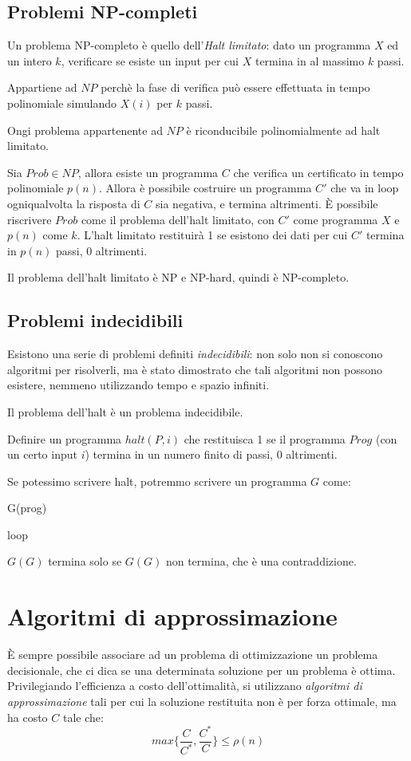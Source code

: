 \documentclass[11pt]{book}
\begin{document}
\section{Problemi NP-completi}
Un problema NP-completo è quello dell'\textit{Halt limitato}: dato un programma $X$ ed un intero $k$, verificare se esiste 
un input per cui $X$ termina in al massimo $k$ passi.

Appartiene ad $NP$ perchè la fase di verifica può essere effettuata in tempo polinomiale simulando $X(i)$ per $k$ passi.

Ongi problema appartenente ad $NP$ è riconducibile polinomialmente ad halt limitato. 

Sia $Prob\in NP$, allora esiste un programma $C$ che verifica un certificato in tempo polinomiale $p(n)$. Allora è possibile 
costruire un programma $C'$ che va in loop ogniqualvolta la risposta di $C$ sia negativa, e termina altrimenti.
È possibile riscrivere $Prob$ come il problema dell'halt limitato, con $C'$ come programma $X$ e $p(n)$ come $k$.
L'halt limitato restituirà 1 se esistono dei dati per cui $C'$ termina in $p(n)$ passi, 0 altrimenti.

Il problema dell'halt limitato è NP e NP-hard, quindi è NP-completo.
\section{Problemi indecidibili}
Esistono una serie di problemi definiti \textit{indecidibili}: non solo non si conoscono algoritmi per risolverli, ma è 
stato dimostrato che tali algoritmi non possono esistere, nemmeno utilizzando tempo e spazio infiniti.

Il problema dell'halt è un problema indecidibile.

Definire un programma $halt(P,i)$ che restituisca 1 se il programma $Prog$ (con un certo input $i$) termina in un numero 
finito di passi, 0 altrimenti.

Se potessimo scrivere halt, potremmo scrivere un programma $G$ come:
\begin{algorithm}[H]
    \caption{G(prog)}
    \begin{algorithmic}
            \State loop 
        \Else{} 
        \EndIf
    \end{algorithmic}
\end{algorithm}
$G(G)$ termina solo se $G(G)$ non termina, che è una contraddizione.
\chapter{Algoritmi di approssimazione}
È sempre possibile associare ad un problema di ottimizzazione un problema decisionale, che ci dica se una determinata soluzione 
per un problema è ottima. Privilegiando l'efficienza a costo dell'ottimalità, si utilizzano \textit{algoritmi di approssimazione}
tali per cui la soluzione restituita non è per forza ottimale, ma ha costo $C$ tale che:
\begin{equation*}
    max\{\frac{C}{C^*},\frac{C^*}{C}\}\leq \rho(n)
\end{equation*}
\end{document}
